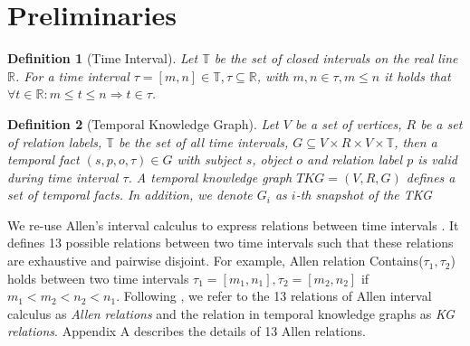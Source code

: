 \documentclass[letterpaper]{article} %
\newcommand{\Tau}{\mathbb{T}}
\newtheorem{definition}{Definition}
\begin{document}
\section{Preliminaries}

\begin{definition}[Time Interval]
Let $\Tau$ be the set of closed intervals on the real line $\mathbb{R}$. For a time interval  $\tau=[m,n] \in\Tau, \tau\subseteq \mathbb{R}$, with $m,n\in \tau, m\leq n$ it holds that $\forall t\in \mathbb{R}: m\leq t\leq n\Rightarrow t\in\tau $.
\end{definition}


\begin{definition}[Temporal Knowledge Graph]
Let $V$ be a set of vertices, $R$ be a set of relation labels, $\Tau$ be the set of all time intervals,
$G\subseteq V\times R \times V \times \Tau$, then a temporal fact $(s,p,o,\tau)\in G$ with subject $s$, object $o$ and relation label $p$ is valid during time interval $\tau$. A temporal knowledge graph $TKG=(V,R,G)$ defines a set of temporal facts. In addition, 
we denote $G_i$ as $i$-th snapshot of the TKG
\end{definition}

We re-use Allen’s interval calculus to express relations between time intervals \cite{allen1983maintaining}. It defines 13 possible relations between two time intervals such that these relations are exhaustive and pairwise disjoint. For example, Allen relation Contains($\tau_1, \tau_2$) holds between two time intervals $\tau_1=[m_1,n_1], \tau_2=[m_2,n_2]$ if $m_1<m_2<n_2<n_1$. Following \cite{singh2023neustip}, we refer to the 13 relations of Allen interval calculus as \textit{Allen relations} and the relation in temporal knowledge graphs as \textit{KG relations}. Appendix A describes the details of 13 Allen relations. 
\end{document}

